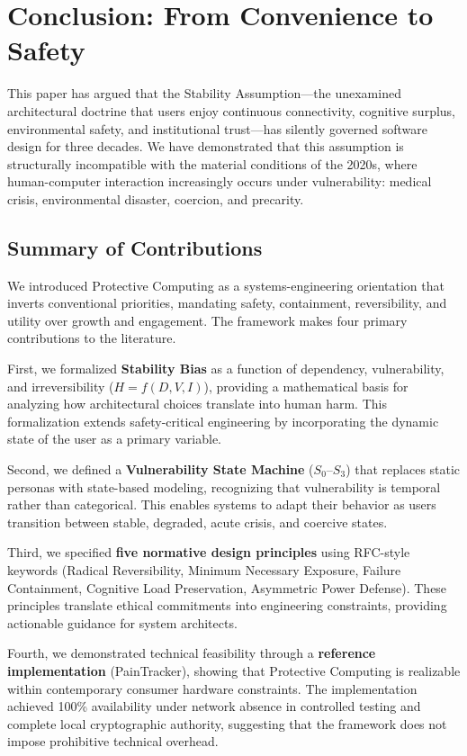 \documentclass[acmsmall,review]{acmart}
\begin{document}
\section{Conclusion: From Convenience to Safety}

This paper has argued that the Stability Assumption---the unexamined architectural doctrine that users enjoy continuous connectivity, cognitive surplus, environmental safety, and institutional trust---has silently governed software design for three decades. We have demonstrated that this assumption is structurally incompatible with the material conditions of the 2020s, where human-computer interaction increasingly occurs under vulnerability: medical crisis, environmental disaster, coercion, and precarity.

\subsection{Summary of Contributions}

We introduced Protective Computing as a systems-engineering orientation that inverts conventional priorities, mandating safety, containment, reversibility, and utility over growth and engagement. The framework makes four primary contributions to the literature.

First, we formalized \textbf{Stability Bias} as a function of dependency, vulnerability, and irreversibility ($H = f(D, V, I)$), providing a mathematical basis for analyzing how architectural choices translate into human harm. This formalization extends safety-critical engineering by incorporating the dynamic state of the user as a primary variable.

Second, we defined a \textbf{Vulnerability State Machine} ($S_0$--$S_3$) that replaces static personas with state-based modeling, recognizing that vulnerability is temporal rather than categorical. This enables systems to adapt their behavior as users transition between stable, degraded, acute crisis, and coercive states.

Third, we specified \textbf{five normative design principles} using RFC-style keywords (Radical Reversibility, Minimum Necessary Exposure, Failure Containment, Cognitive Load Preservation, Asymmetric Power Defense). These principles translate ethical commitments into engineering constraints, providing actionable guidance for system architects.

Fourth, we demonstrated technical feasibility through a \textbf{reference implementation} (PainTracker), showing that Protective Computing is realizable within contemporary consumer hardware constraints. The implementation achieved 100\% availability under network absence in controlled testing and complete local cryptographic authority, suggesting that the framework does not impose prohibitive technical overhead.
\end{document}
